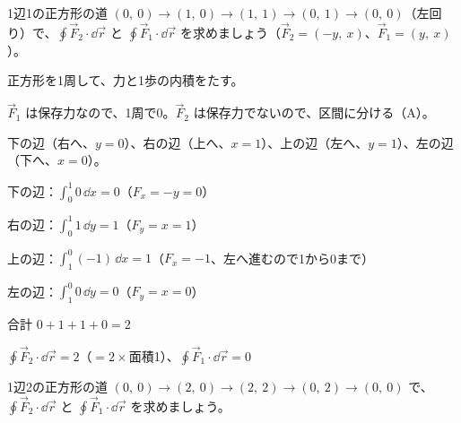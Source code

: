 \begin{reidai}[閉じた道の線積分]
1辺1の正方形の道 $(0,\ 0)\to(1,\ 0)\to(1,\ 1)\to(0,\ 1)\to(0,\ 0)$（左回り）で、$\oint\vec F_2\cdot\dd\vec r$ と $\oint\vec F_1\cdot\dd\vec r$ を求めましょう（$\vec F_2=(-y,\ x)$、$\vec F_1=(y,\ x)$）。\par
\kangaekata {}\par
{}\enspace 正方形を1周して、力と1歩の内積をたす。\par
{}\enspace $\vec F_1$ は保存力なので、1周で0。$\vec F_2$ は保存力でないので、区間に分ける（A）。\par
{}\enspace 下の辺（右へ、$y=0$）、右の辺（上へ、$x=1$）、上の辺（左へ、$y=1$）、左の辺（下へ、$x=0$）。\par
\shiki\kviiihs{}\zw{} 下の辺：$\int_0^1 0\,\dd x=0$\quad （$F_x=-y=0$）\par
\kviiiha 右の辺：$\int_0^1 1\,\dd y=1$\quad （$F_y=x=1$）\par
\kviiiha 上の辺：$\int_1^0(-1)\,\dd x=1$\quad （$F_x=-1$、左へ進むので1から0まで）\par
\kviiiha 左の辺：$\int_1^0 0\,\dd y=0$\quad （$F_y=x=0$）\par
\kviiiha 合計 $0+1+1+0=2$\par
\kotae $\oint\vec F_2\cdot\dd\vec r=2$（$=2\times$面積1）、$\oint\vec F_1\cdot\dd\vec r=0$
\end{reidai}

\begin{jibun}
1辺2の正方形の道 $(0,\ 0)\to(2,\ 0)\to(2,\ 2)\to(0,\ 2)\to(0,\ 0)$ で、$\oint\vec F_2\cdot\dd\vec r$ と $\oint\vec F_1\cdot\dd\vec r$ を求めましょう。
\end{jibun}

